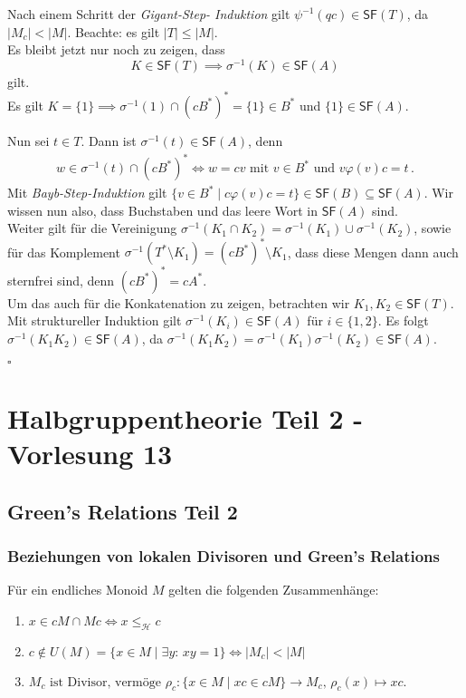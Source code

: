 \documentclass[12pt, german]{article}
\newcommand{\inv}{^{-1}}
\newcommand{\starfree}{\mathsf{SF}}
\newcommand{\lgreheq}{\leqslant_{\mathcal{H}}}
\newcommand{\aast}{A^{\ast}}
\newcommand{\bast}{B^{\ast}}
\newcommand{\bewiesen}{
	
	\begin{flushright}
		$\square$  \\
\end{flushright}}
\begin{document}
	Nach einem Schritt der \textit{Gigant-Step- Induktion} gilt $\psi\inv(qc) \in \starfree(T)$, da $|M_c| < |M|$. Beachte: es gilt $|T| \leq |M|$.\\
	Es bleibt jetzt nur noch zu zeigen, dass 
	$$ K \in \starfree(T) \implies \sigma\inv(K) \in \starfree(A)$$
	gilt.\\
	Es gilt $K = \{1\} \implies \sigma\inv(1) \cap (c\bast)^\ast = \{1\} \in \bast$ und $\{1\} \in \starfree(A)$.
	\newline
	
	Nun sei $t \in T$. Dann ist $\sigma\inv(t) \in \starfree(A)$, denn 
	\begin{align*}
		w \in \sigma\inv(t) \cap(c\bast)^\ast \iff w = cv \text{ mit } v \in \bast \text{ und } v \varphi(v)c = t\, .
	\end{align*} 
	Mit \textit{Bayb-Step-Induktion} gilt $\{v \in B^\ast \mid c \varphi(v)c = t\} \in \starfree(B) \subseteq \starfree(A)$. 
	Wir wissen nun also, dass Buchstaben und das leere Wort in $\starfree(A)$ sind.\\
			
	Weiter gilt für die Vereinigung $\sigma\inv(K_1 \cap K_2) = \sigma\inv(K_1) \cup \sigma\inv(K_2)$, sowie für das Komplement $\sigma\inv(T^\ast \setminus K_1) = (c\bast)^\ast \setminus K_1$, dass diese Mengen dann auch sternfrei sind, denn $(c\bast)^\ast = c \aast$.\\
	Um das auch für die Konkatenation zu zeigen, betrachten wir $K_1, K_2 \in \starfree(T)$. Mit struktureller Induktion gilt $\sigma\inv (K_i) \in \starfree(A)$ für $i \in \{1,2\}$.
	Es folgt $\sigma\inv(K_1K_2) \in \starfree(A)$, da $\sigma\inv(K_1K_2) = \sigma\inv(K_1) \sigma\inv(K_2) \in \starfree(A)$. 
	\bewiesen
	
	\section{Halbgruppentheorie Teil 2 - Vorlesung 13}
	\subsection{Green's Relations Teil 2}
	
	\subsubsection{Beziehungen von lokalen Divisoren und Green's Relations}
	Für ein endliches Monoid $M$ gelten die  folgenden Zusammenhänge:
	\begin{enumerate}
		\item $x \in cM \cap Mc \iff x \lgreheq c$
		\item $c \notin U(M) = \{x \in M \mid \exists y:\, xy=1\} \iff |M_c| < |M|$
		\item  $M_c \text{ ist Divisor, vermöge } \rho_c: \{x \in M \mid xc \in cM\} \to  M_c,\, \rho_c(x) \mapsto xc$.
	\end{enumerate}
		
\end{document}
